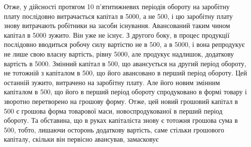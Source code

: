 Отже, у дійсності протягом 10 п’ятитижневих періодів обороту на
заробітну плату послідовно витрачається капітал в 5000, а
не 500, і цю заробітну плату знову витрачають робітники
на засоби існування. Авансований таким чином капітал в 5000 зужито. Він уже не існує. З другого боку, в процес продукції
послідовно вводиться робочу силу вартістю не в 500, а в 5000,
і вона репродукує не лише свою власну вартість, рівну 5000,
але продукує надлишок, додаткову вартість в 5000. Змінний
капітал в 500, що авансується на другий період обороту, не тотожній
з капіталом в 500, що його авансовано в перший період
обороту. Цей останній зужито, витрачено на заробітну плату. Але його
 новим змінним капіталом в 500, що його в перший
період обороту спродуковано в формі товару і зворотно перетворено
на грошову форму. Отже, цей новий грошовий капітал в 500 є
грошова форма товарової маси, новоспродукованої в перший період обороту.
Та обставина, що в руках капіталіста знову є тотожня грошова
сума в 500, тобто, лишаючи осторонь додаткову вартість, саме
стільки грошового капіталу, скільки він первісно авансував, замасковує
\parbreak{}  %
